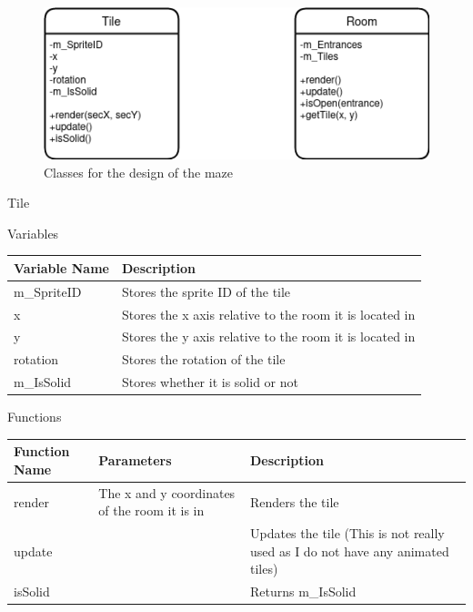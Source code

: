 \documentclass[../../Main.tex]{subfiles}
\begin{document}
    \begin{figure}[hbt!]
        \centerline{\includegraphics[scale=0.5]{img/Classes/Rooms.png}}
        \caption{Classes for the design of the maze}
        \label{fig}
    \end{figure}
    Tile
    \begin{center}
        Variables
        \begin{tabular}{ | m{} | m{} | }
            \hline
            \textbf{Variable Name} & \textbf{Description} \\
            \hline
            m\_SpriteID & Stores the sprite ID of the tile \\
            \hline
            x & Stores the x axis relative to the room it is located in \\
            \hline
            y & Stores the y axis relative to the room it is located in \\
            \hline
            rotation & Stores the rotation of the tile \\
            \hline
            m\_IsSolid & Stores whether it is solid or not \\
            \hline
        \end{tabular}
        Functions
        \begin{tabular}{ | m{} | m{}| m{} | }
            \hline
            \textbf{Function Name} & \textbf{Parameters} & \textbf{Description} \\
            \hline
            render & The x and y coordinates of the room it is in & Renders the tile \\
            \hline
            update & & Updates the tile (This is not really used as I do not have any animated tiles) \\
            \hline
            isSolid & & Returns m\_IsSolid \\
            \hline
        \end{tabular}
    \end{center}
\end{document}
